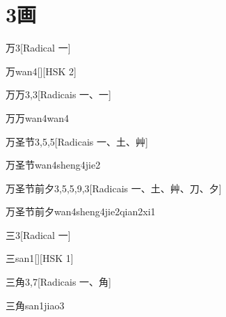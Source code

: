 
\section*{3画}

\begin{entry}{万}{3}[Radical ⼀]
  \begin{phonetics}{万}{wan4}[][HSK 2]
  \end{phonetics}
\end{entry}

\begin{entry}{万万}{3,3}[Radicais ⼀、⼀]
  \begin{phonetics}{万万}{wan4wan4}
  \end{phonetics}
\end{entry}

\begin{entry}{万圣节}{3,5,5}[Radicais ⼀、⼟、⾋]
  \begin{phonetics}{万圣节}{wan4sheng4jie2}
  \end{phonetics}
\end{entry}

\begin{entry}{万圣节前夕}{3,5,5,9,3}[Radicais ⼀、⼟、⾋、⼑、⼣]
  \begin{phonetics}{万圣节前夕}{wan4sheng4jie2qian2xi1}
  \end{phonetics}
\end{entry}

\begin{entry}{三}{3}[Radical ⼀]
  \begin{phonetics}{三}{san1}[][HSK 1]
  \end{phonetics}
\end{entry}

\begin{entry}{三角}{3,7}[Radicais ⼀、⾓]
  \begin{phonetics}{三角}{san1jiao3}
  \end{phonetics}
\end{entry}

